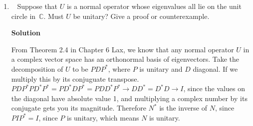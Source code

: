 \documentclass[11pt]{article}
\newcommand\score[1]{\marginpar{\vspace{-2ex}\color{blue}{#1/14}}\hspace{-1ex}}
\newcommand\0{\mathbf{0}}
\newcommand\CC{\mathbb{C}}
\newcommand\<{\langle}
\renewcommand\>{\rangle}
\begin{document}
\begin{enumerate}
For an entry in $(I+A)^{n-1}$ to be zero it must mean that there is no path between some two cities that containts
any number of roads between 0 to $n-1$ roads, but that is just nonsense because we know that there is a 
path between any two citeis and no path between any two cities need not be longer that $n-1$(if you start at one city and can get to another city, then 
the shortest path between the city you are in and the other city, can't be longer than $n-1$, otherwise you had to revist one city). $(I+A)^{n-1}$ effectively 
takes a snapshot of all paths between any two cities, and since we said that you can get from one city to any other city after some number of walks, all the 
entries in $(I+A)^{n-1}$ must be strictly positive.

\item\ \score{}%
Suppose that $U$ is a normal operator whose eigenvalues all lie on the
unit circle in~$\CC$.  Must $U$ be unitary?  Give a proof or
counterexample.

\textbf{Solution}

From Theorem 2.4 in Chapter 6 Lax, we know that any normal operator $U$ in a complex vector space has an orthonormal basis of 
eigenvectors. Take the decomposition of $U$ to be $PDP^{*}$, where $P$ is unitary and $D$ diagonal. If we  multiply this by its conjuguate transpose. $PDP^{*}PD^{*}P^{*}=PD^{*}DP^{*}=PDD^{*}P^{*}\rightarrow DD^{*}=D^{*}D\rightarrow I$,
since the values on the diagonal have absolute value 1, and multiplying a complex number by its conjugate gets you its magnitude. Therefore $N^{*}$ is the inverse of $N$, since $PIP^{*}=I$, since $P$ is 
unitary, which means $N$ is unitary.



\end{enumerate}
\end{document}

